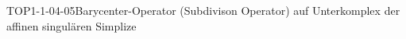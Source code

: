 
\begin{DEF}{TOP1-1-04-05}{Barycenter-Operator (Subdivison Operator) auf Unterkomplex der affinen singulären Simplize}
\end{DEF}
